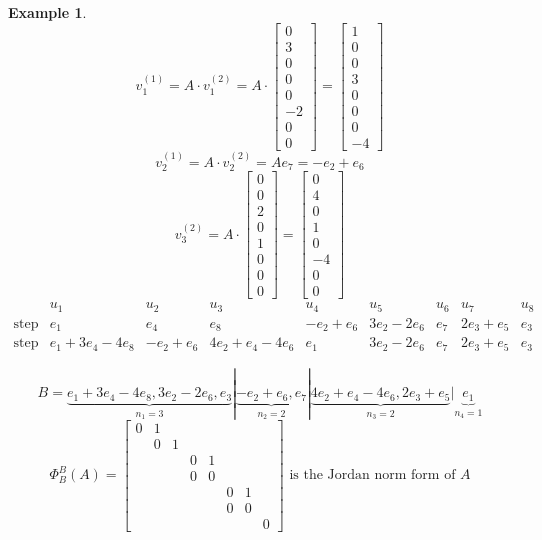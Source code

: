 \documentclass{article}
\newtheorem{example}{Example}  \numberwithin{example}{section}
\begin{document}
\begin{example}
  \[
    v_1^{(1)} = A \cdot v_1^{(2)}
    = A \cdot \begin{bmatrix} 0 \\ 3 \\ 0 \\ 0 \\ 0 \\-2 \\ 0 \\ 0 \end{bmatrix}
    = \begin{bmatrix} 1 \\ 0 \\ 0 \\ 3 \\ 0 \\ 0 \\ 0 \\ -4 \end{bmatrix}
  \] \[
    v_2^{(1)} = A \cdot v_2^{(2)} = A e_7 = -e_2 + e_6
  \] \[
    v_3^{(2)} = A \cdot \begin{bmatrix} 0 \\ 0 \\ 2 \\ 0 \\ 1 \\ 0 \\ 0 \\ 0 \end{bmatrix} = \begin{bmatrix} 0 \\ 4 \\ 0 \\ 1 \\ 0 \\ -4 \\ 0 \\ 0 \end{bmatrix}
  \]
  \begin{align*}
                  & u_1 & u_2 & u_3 & u_4 & u_5 & u_6 & u_7 & u_8 \\
    \text{step 2} & e_1 & e_4 & e_8 & -e_2+e_6 & 3e_2-2e_6 & e_7 & 2e_3+e_5 & e_3 \\
    \text{step 3} & e_1+3e_4-4e_8 & -e_2+e_6 & 4e_2+e_4-4e_6 & e_1 & 3e_2-2e_6 & e_7 & 2e_3+e_5 & e_3
  \end{align*}

  \[
    B = \underbrace{e_1 + 3e_4 - 4e_8, 3e_2 - 2e_6, e_3}_{n_1 = 3} | \underbrace{-e_2+e_6, e_7}_{n_2 = 2} | \underbrace{4e_2 + e_4 - 4e_6, 2e_3 + e_5}_{n_3 = 2} | \underbrace{e_1}_{n_4 = 1}
  \] \[
    \Phi_B^B(A) = \begin{bmatrix}
      0 & 1 &   &   &   &   &   & \\
        & 0 & 1 &   &   &   &   & \\
        &   &   & 0 & 1 &   &   & \\
        &   &   & 0 & 0 &   &   & \\
        &   &   &   &   & 0 & 1 & \\
        &   &   &   &   & 0 & 0 & \\
        &   &   &   &   &   &   & 0
    \end{bmatrix}
    \text{ is the Jordan norm form of } A
  \]
\end{example}
\end{document}
